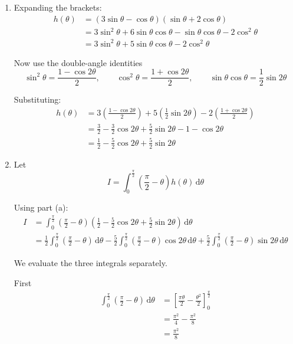 \documentclass[leqno]{article}
\begin{document}
\begin{enumerate}[
  label=\textbf{\arabic*.},
  leftmargin=*,
  topsep=0pt,
  partopsep=0pt,
  parsep=0pt
]
\vspace*{10pt}

\begin{djsSolution}
\begin{enumerate}[label=\textbf{(\alph*)}]
\item Expanding the brackets:
\begin{align*}
h(\theta)
&=(3\sin\theta-\cos\theta)(\sin\theta+2\cos\theta)\\
&=3\sin^2\theta+6\sin\theta\cos\theta-\sin\theta\cos\theta-2\cos^2\theta\\
&=3\sin^2\theta+5\sin\theta\cos\theta-2\cos^2\theta
\end{align*}

Now use the double-angle identities
\[
\sin^2\theta=\frac{1-\cos2\theta}{2},\qquad
\cos^2\theta=\frac{1+\cos2\theta}{2},\qquad
\sin\theta\cos\theta=\frac12\sin2\theta
\]

Substituting:
\begin{align*}
h(\theta)
&=3\left(\frac{1-\cos2\theta}{2}\right)+5\left(\frac12\sin2\theta\right)-2\left(\frac{1+\cos2\theta}{2}\right)\\
&=\frac32-\frac32\cos2\theta+\frac52\sin2\theta-1-\cos2\theta\\
&=\frac12-\frac52\cos2\theta+\frac52\sin2\theta
\end{align*}

\item Let
\[
I=\int_{0}^{\frac{\pi}{2}}\left(\frac{\pi}{2}-\theta\right)h(\theta)\,\mathrm{d}\theta
\]

Using part (a):
\begin{align*}
I
&=\int_{0}^{\frac{\pi}{2}}\left(\frac{\pi}{2}-\theta\right)\left(\frac12-\frac52\cos2\theta+\frac52\sin2\theta\right)\,\mathrm{d}\theta\\
&=\frac12\int_{0}^{\frac{\pi}{2}}\left(\frac{\pi}{2}-\theta\right)\,\mathrm{d}\theta
-\frac52\int_{0}^{\frac{\pi}{2}}\left(\frac{\pi}{2}-\theta\right)\cos2\theta\,\mathrm{d}\theta
+\frac52\int_{0}^{\frac{\pi}{2}}\left(\frac{\pi}{2}-\theta\right)\sin2\theta\,\mathrm{d}\theta
\end{align*}

We evaluate the three integrals separately.

First
\begin{align*}
\int_{0}^{\frac{\pi}{2}}\left(\frac{\pi}{2}-\theta\right)\,\mathrm{d}\theta
&=\left[\frac{\pi\theta}{2}-\frac{\theta^2}{2}\right]_{0}^{\frac{\pi}{2}}\\
&=\frac{\pi^2}{4}-\frac{\pi^2}{8}\\
&=\frac{\pi^2}{8}
\end{align*}


\end{enumerate}
\end{djsSolution}
\end{enumerate}
\end{document}
